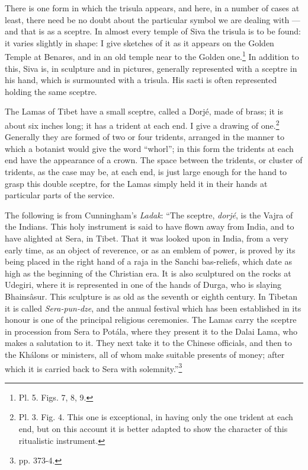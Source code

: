 \documentclass[a4paper, 11pt, oneside, english]{article}
\begin{document}
There is one form in which the trisula appears, and here, in a number of cases at least, there need be no doubt about the particular symbol we are dealing with --- and that is as a sceptre. In almost every temple of Siva the trisula is to be found: it varies slightly in shape: I give sketches of it as it appears on the Golden Temple at Benares, and in an old temple near to the Golden one.\footnote{Pl. 5. Figs. 7, 8, 9.} In addition to this, Siva is, in sculpture and in pictures, generally represented with a sceptre in his hand, which is surmounted with a trisula. His sacti is often represented holding the same sceptre.

The Lamas of Tibet have a small sceptre, called a Dorjé, made of brass; it is about six inches long; it has a trident at each end. I give a drawing of one.\footnote{Pl. 3. Fig. 4. This one is exceptional, in having only the one trident at each end, but on this account it is better adapted to show the character of this ritualistic instrument.} Generally they are formed of two or four tridents, arranged in the manner to which a botanist would give the word ``whorl''; in this form the tridents at each end have the appearance of a crown. The space between the tridents, or cluster of tridents, as the case may be, at each end, is just large enough for the hand to grasp this double sceptre, for the Lamas simply held it in their hands at particular parts of the service.

The following is from Cunningham's \emph{Ladak}: ``The sceptre, \emph{dorjé}, is the Vajra of the Indians. This holy instrument is said to have flown away from India, and to have alighted at Sera, in Tibet. That it was looked upon in India, from a very early time, as an object of reverence, or as an emblem of power, is proved by its being placed in the right hand of a raja in the Sanchi bas-reliefs, which date as high as the beginning of the Christian era. It is also sculptured on the rocks at Udegiri, where it is represented in one of the hands of Durga, who is slaying Bhainsâsur. This sculpture is as old as the seventh or eighth century. In Tibetan it is called \emph{Sera-pun-dze}, and the annual festival which has been established in its honour is one of the principal religious ceremonies. The Lamas carry the sceptre in procession from Sera to Potála, where they present it to the Dalai Lama, who makes a salutation to it. They next take it to the Chinese officials, and then to the Khálons or ministers, all of whom make suitable presents of money; after which it is carried back to Sera with solemnity.''\footnote{pp. 373-4.}
\end{document}
